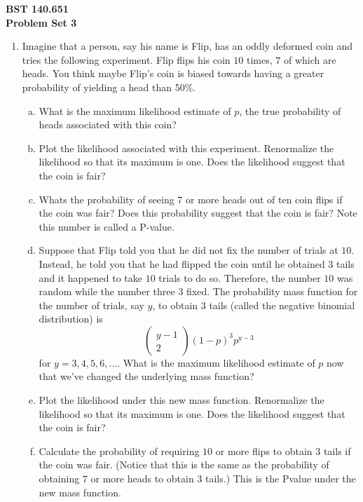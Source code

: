 \documentclass[12pt]{article}
\begin{document}
\noindent
{\bf BST 140.651 \\ Problem Set 3} \\

\begin{enumerate}[Problem 1.]
\item Imagine that a person, say his name is Flip, has an oddly
  deformed coin and tries the following experiment.  Flip flips his
  coin $10$ times, $7$ of which are heads. You think maybe Flip's coin
  is biased towards having a greater probability of yielding a head than 50\%.
  \begin{enumerate}[a.]
  \item What is the maximum likelihood estimate of $p$, the true probability of
    heads associated with this coin?
  \item Plot the likelihood associated with this experiment. Renormalize the
    likelihood so that its maximum is one. Does the likelihood suggest that
    the coin is fair?
  \item Whats the probability of seeing $7$ or more heads out of ten
    coin flips if the coin was fair? Does this probability suggest
    that the coin is fair? Note this number is called a P-value.
  \item Suppose that Flip told you that he did not fix the number of
    trials at $10$. Instead, he told you that he had flipped the coin
    until he obtained $3$ tails and it happened to take $10$ trials to
    do so. Therefore, the number $10$ was random while the number
    three $3$ fixed.  The probability mass function for the number of
    trials, say $y$, to obtain $3$ tails (called the negative binomial
    distribution) is
    $$
    \left(\begin{array}{c}y-1 \\ 2\end{array}\right)(1-p)^3p^{y - 3}
    $$
    for $y=3,4,5,6,\ldots$. What is the maximum likelihood estimate of
    $p$ now that we've changed the underlying mass function?
  \item Plot the likelihood under this new mass function. Renormalize
    the likelihood so that its maximum is one. Does the likelihood
    suggest that the coin is fair?
  \item Calculate the probability of requiring $10$ or more flips to
    obtain $3$ tails if the coin was fair. (Notice that this is the
    same as the probability of obtaining $7$ or more heads to obtain
    $3$ tails.) This is the Pvalue under
    the new mass function.
    \ \\ \ \\

\end{enumerate}
\end{enumerate}
\end{document}
